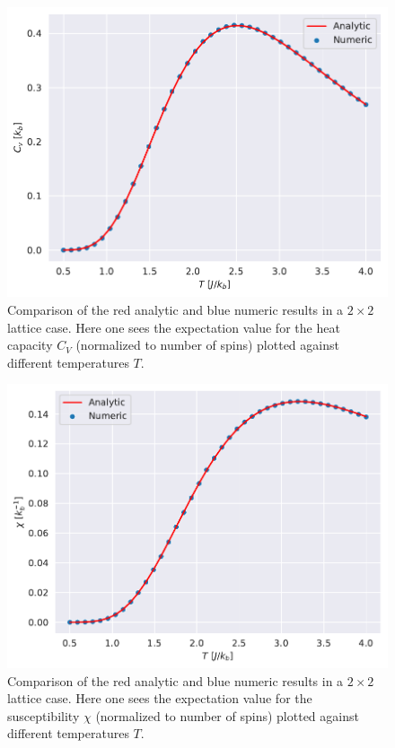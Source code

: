 \documentclass[english,notitlepage,reprint,nofootinbib]{revtex4-1}  %
\begin{document}
\begin{figure}[H]
    \centering
    \includegraphics[width=.5\textwidth]{../figures/numeric_analytic_c_v_T.pdf}
    \caption{Comparison of the red analytic and blue numeric results in a $2 \times 2$ lattice case. Here one sees the expectation value for the heat capacity $C_V$ (normalized to number of spins) plotted against different temperatures $T$.}
    \label{fig:numeric_analytic_c_v_T}
\end{figure}

\begin{figure}[H]
    \centering
    \includegraphics[width=.5\textwidth]{../figures/numeric_analytic_X_T.pdf}
    \caption{Comparison of the red analytic and blue numeric results in a $2 \times 2$ lattice case. Here one sees the expectation value for the susceptibility $\chi$ (normalized to number of spins) plotted against different temperatures $T$.}
    \label{fig:numeric_analytic_X_T}
\end{figure}



\end{document}
